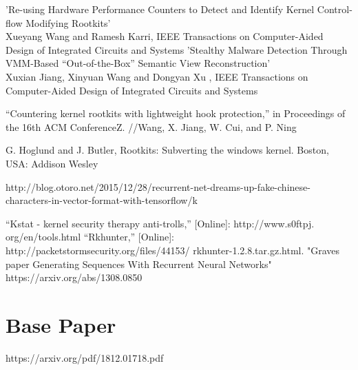 \documentclass[12pt]{report}
\begin{document}
\begin{thebibliography}{999}

\bibitem{} 'Re-using Hardware Performance Counters to Detect
and Identify Kernel Control-flow Modifying
Rootkits' \\Xueyang Wang and  Ramesh Karri, IEEE Transactions on
Computer-Aided Design of Integrated Circuits and Systems
\bibitem{} 'Stealthy Malware Detection Through VMM-Based
“Out-of-the-Box” Semantic View Reconstruction' \\Xuxian Jiang, Xinyuan
Wang and Dongyan Xu , IEEE Transactions on Computer-Aided Design of
Integrated Circuits and Systems

\bibitem{}“Countering kernel rootkits
with lightweight hook protection,” in Proceedings of the 16th ACM
ConferenceZ. //Wang, X. Jiang, W. Cui, and P. Ning

\bibitem{}G. Hoglund and J. Butler, Rootkits: Subverting the windows kernel.
Boston, USA: Addison Wesley

\bibitem{} http://blog.otoro.net/2015/12/28/recurrent-net-dreams-up-fake-chinese-characters-in-vector-format-with-tensorflow/k

\bibitem{}“Kstat - kernel security therapy anti-trolls,” [Online]:
http://www.s0ftpj.
org/en/tools.html
\bibitem{}“Rkhunter,” [Online]: http://packetstormsecurity.org/files/44153/
rkhunter-1.2.8.tar.gz.html.
\bibitem{} "Graves paper Generating Sequences With Recurrent Neural
Networks" https://arxiv.org/abs/1308.0850



\end{thebibliography}
\appendix{}
\cleardoublepage
{}
\setcounter{chapter}{-1}
\chapter{Base Paper}%
https://arxiv.org/pdf/1812.01718.pdf
\end{document}
